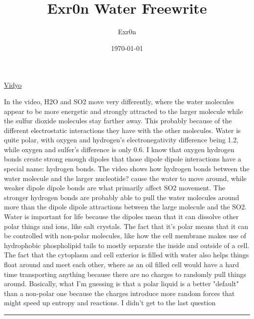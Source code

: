 \documentclass[letterpaper]{article}
\author{Exr0n}
\date{\today}
\title{Exr0n Water Freewrite}
\renewcommand\maketitle{}
\begin{document}
\maketitle
\href{https://docs.google.com/presentation/d/1tYwRk-rYtHwZPECztaiCxoiZd8ct2XSVFBEV3YTWC90/edit?usp=sharing}{Vidyo}

In the video, H2O and SO2 move very differently, where the water
molecules appear to be more energetic and strongly attracted to the
larger molecule while the sulfur dioxide molecules stay farther away.
This probably because of the different electrostatic interactions they
have with the other molecules. Water is quite polar, with oxygen and
hydrogen's electronegativity difference being 1.2, while oxygen and
sulfer's difference is only 0.6. I know that oxygen hydrogen bonds
create strong enough dipoles that those dipole dipole interactions have
a special name: hydrogen bonds. The video shows how hydrogen bonds
between the water molecule and the larger nucleotide? cause the water to
move around, while weaker dipole dipole bonds are what primarily affect
SO2 movement. The stronger hydrogen bonds are probably able to pull the
water molecules around more than the dipole dipole attractions between
the large molecule and the SO2. Water is important for life because the
dipoles mean that it can dissolve other polar things and ions, like salt
crystals. The fact that it's polar means that it can be controlled with
non-polar molecules, like how the cell membrane makes use of hydrophobic
phospholipid tails to mostly separate the inside and outside of a cell.
The fact that the cytoplasm and cell exterior is filled with water also
helps things float around and meet each other, where as an oil filled
cell would have a hard time transporting anything because there are no
charges to randomly pull things around. Basically, what I'm guessing is
that a polar liquid is a better "default" than a non-polar one because
the charges introduce more random forces that might speed up entropy and
reactions. I didn't get to the last question

\noindent\rule{\textwidth}{0.5pt}
\end{document}
